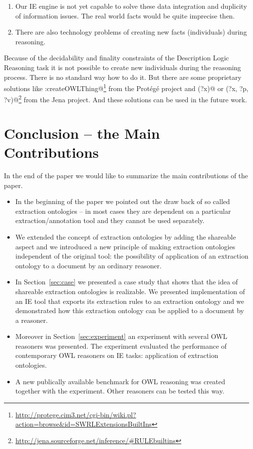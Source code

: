 \documentclass[10pt, conference, compsocconf]{IEEEtran}
\begin{document}
\begin{enumerate}
	\item Our IE engine is not yet capable to solve these data integration and duplicity of information issues. The real world facts would be quite imprecise then.
	\item There are also technology problems of creating new facts (individuals) during reasoning.
\end{enumerate}

Because of the decidability and finality constraints of the Description Logic Reasoning task it is not possible to create new individuals during the reasoning process. There is no standard way how to do it. But there are some proprietary solutions like \verb@swrlx:createOWLThing@\footnote{\url{http://protege.cim3.net/cgi-bin/wiki.pl?action=browse&id=SWRLExtensionsBuiltIns}} from the Prot\'{e}g\'{e} project and \verb@makeTemp(?x)@ or \verb@makeInstance(?x, ?p, ?v)@\footnote{\url{http://jena.sourceforge.net/inference/#RULEbuiltins}} from the Jena project.
And these solutions can be used in the future work. 




\section{Conclusion -- the Main Contributions}

In the end of the paper we would like to summarize the main contributions of the paper.

\begin{itemize}
	\item In the beginning of the paper we pointed out the draw back of so called extraction ontologies -- in most cases they are dependent on a particular extraction/annotation tool and they cannot be used separately.	
	\item We extended the concept of extraction ontologies by adding the shareable aspect and we introduced a new principle of making extraction ontologies independent of the original tool: the possibility of application of an extraction ontology to a document by an ordinary reasoner.
	\item In Section~\ref{sec:case} we presented a case study that shows that the idea of shareable extraction ontologies is realizable. We presented implementation of an IE tool that exports its extraction rules to an extraction ontology and we demonstrated how this extraction ontology can be applied to a document by a reasoner.
	\item Moreover in Section~\ref{sec:experiment} an experiment with several OWL reasoners was presented. The experiment evaluated the performance of contemporary OWL reasoners on IE tasks: application of extraction ontologies.  
	\item A new publically available benchmark for OWL reasoning was created together with the experiment. Other reasoners can be tested this way.
\end{itemize}
   
\end{document}
